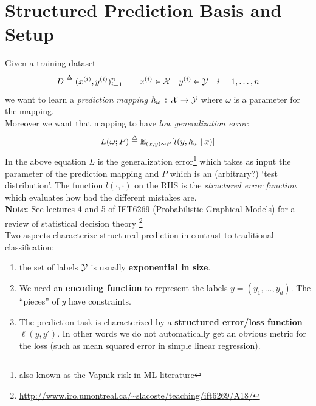 



\maketitle

\section{Structured Prediction Basis and Setup}
Given a training dataset
\begin{equation}
    D \mathrel{\stackrel{\Delta}{=}} (x^{(i)}, y^{(i)})_{i=1}^n \qquad x^{(i)} \in \mathcal{X} \quad y^{(i)} \in \mathcal{Y} \quad i=1,\ldots,n
\end{equation}
we want to learn a \emph{prediction mapping} 
$h_\omega \, : \, \mathcal{X} \rightarrow \mathcal{Y}$ where $\omega$ is a parameter for the
mapping.\\
Moreover we want that mapping to have \emph{low generalization error}:
\begin{equation}
    L(\omega;P) \mathrel{\stackrel{\Delta}{=}} \mathbb{E}_{(x,y) \sim P} [ l(y, h_\omega \:\vert\: x)]
    \label{eq:vrisk}
\end{equation}
In the above equation $L$ is the generalization error\footnote{also known as the
Vapnik risk in ML literature} which takes as input the parameter 
of the prediction mapping and $P$ which is an (arbitrary?) `test distribution'.
The function $l(\cdot,\cdot)$ on the RHS is the \emph{structured error
function} which evaluates how bad the different mistakes are.\\

\noindent\textbf{Note:} See lectures 4 and 5 of IFT6269 (Probabilistic
Graphical Models) for a review of statistical decision theory%
\footnote{\url{http://www.iro.umontreal.ca/~slacoste/teaching/ift6269/A18/}}\\

\noindent Two aspects characterize structured prediction in contrast to traditional
classification:
\begin{enumerate}
\item the set of labels $\mathcal{Y}$ is usually \textbf{exponential in size}.
\item We need an \textbf{encoding function} to
    represent the labels $y=(y_1,\ldots,y_d)$. The ``pieces'' of $y$ have
    constraints.
\item The prediction task is characterized by a \textbf{structured error/loss
    function} $\ell(y,y')$. In other words we do not automatically get
    an obvious metric for the loss (such as mean squared error in simple
    linear regression).
\end{enumerate}


